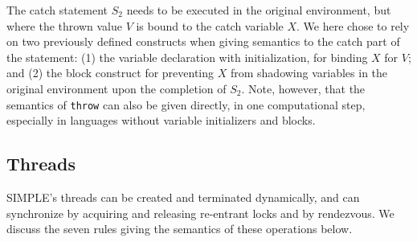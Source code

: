 \documentclass{article}
\begin{document}
\begin{kdefinition}
\begin{module}{}
\begin{syntaxBlock}{}
\end{syntaxBlock}
\begin{kblock}[text]
 The catch statement $S_2$ needs to be executed in the original environment,
but where the thrown value $V$ is bound to the catch variable $X$.  We here
chose to rely on two previously defined constructs when giving semantics to
the catch part of the statement: (1) the variable declaration with
initialization, for binding $X$ for $V$; and (2) the block construct for
preventing $X$ from shadowing variables in the original environment upon the
completion of $S_2$.  Note, however, that the semantics of {\tt throw} can
also be given directly, in one computational step, especially in languages
without variable initializers and blocks. \end{kblock}
\begin{kblock}[text]
 \subsection{Threads}
SIMPLE's threads can be created and terminated dynamically, and can
synchronize by acquiring and releasing re-entrant locks and by rendezvous.
We discuss the seven rules giving the semantics of these operations below. \end{kblock}
\begin{kblock}[text]

\end{kblock}
\end{module}
\end{kdefinition}
\end{document}
